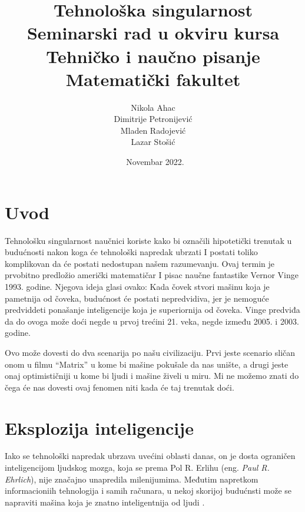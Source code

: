 \documentclass[a4paper]{article}
\begin{document}
\title{Tehnološka singularnost\\ \small{Seminarski rad u okviru kursa\\Tehničko i naučno pisanje\\ Matematički fakultet}}

\author{Nikola Ahac\\ Dimitrije Petronijević\\ Mladen Radojević\\ Lazar Stošić}
\date{~Novembar 2022.}
\maketitle



\tableofcontents

\newpage

\section{Uvod}
\label{sec:uvod}
Tehnološku singularnost naučnici koriste kako bi označili hipotetički trenutak u budućnosti nakon koga će tehnološki napredak ubrzati I postati toliko komplikovan da će postati nedostupan našem razumevanju. Ovaj termin je prvobitno predložio američki matematičar I pisac naučne fantastike Vernor Vinge 1993. godine. Njegova ideja glasi ovako: Kada čovek stvori mašinu koja je pametnija od čoveka, budućnost će postati nepredvidiva, jer je nemoguće predviddeti ponašanje inteligencije koja je superiornija od čoveka. Vinge predviđa da do ovoga može doći negde u prvoj trećini 21. veka, negde između 2005. i 2003. godine. 

Ovo može dovesti do dva scenarija po našu civilizaciju. Prvi jeste scenario sličan onom u filmu “Matrix” u kome bi mašine pokušale da nas unište, a drugi jeste onaj optimističniji u kome bi ljudi i mašine živeli u miru. Mi ne možemo znati do čega će nas dovesti ovaj fenomen niti kada će taj trenutak doći.

\section{Eksplozija inteligencije}
Iako se tehnološki napredak ubrzava uvećini oblasti danas, on je dosta ograničen inteligencijom ljudskog mozga, koja se prema Pol R. Erlihu (eng. \textit{Paul R. Ehrlich}), nije značajno unapredila milenijumima.\cite{ref 1} Međutim napretkom informacioniih tehnologija i samih računara, u nekoj skorijoj budućnsti može se napraviti mašina koja je znatno inteligentnija od ljudi .\cite{ref 2}
\end{document}
